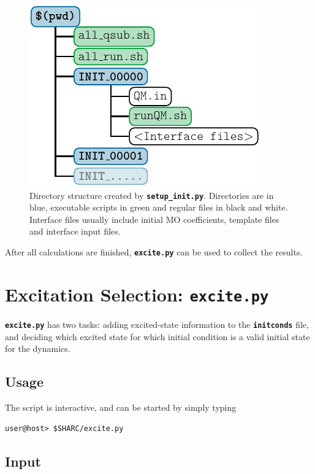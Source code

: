 \documentclass[a4paper,10pt,DIV=15,openany]{scrbook}
\newcommand{\ttt}[1]{\textbf{\texttt{#1}}}
\begin{document}
\begin{figure}
  \centering
  \includegraphics[scale=1]{img/dirs_init/dirs_init.pdf}
  \caption[Directory structure created by \ttt{setup\_init.py}.]{Directory structure created by \ttt{setup\_init.py}. Directories are in blue, executable scripts in green and regular files in black and white. Interface files usually include initial MO coefficients, template files and interface input files.}
  \label{fig:dirs_init}
\end{figure}

After all calculations are finished, \ttt{excite.py} can be used to collect the results.





\section{Excitation Selection: \ttt{excite.py}}\label{sec:excite.py}

\ttt{excite.py} has two tasks: adding excited-state information to the \ttt{initconds} file, and deciding which excited state for which initial condition is a valid initial state for the dynamics.


\subsection{Usage}

The script is interactive, and can be started by simply typing 
\begin{verbatim}
user@host> $SHARC/excite.py
\end{verbatim}


\subsection{Input}
\end{document}
